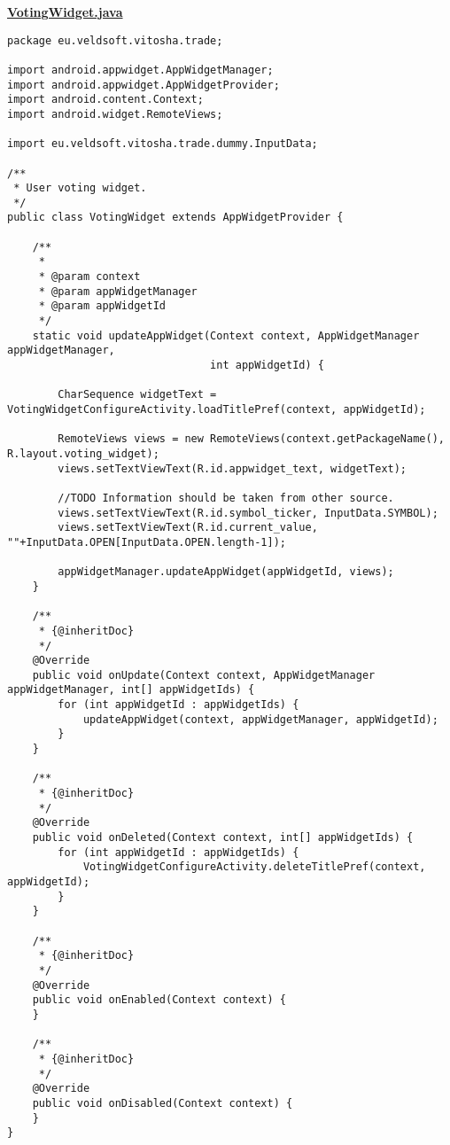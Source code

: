 \textbf{\underline{VotingWidget.java}}
\begin{verbatim}
package eu.veldsoft.vitosha.trade;

import android.appwidget.AppWidgetManager;
import android.appwidget.AppWidgetProvider;
import android.content.Context;
import android.widget.RemoteViews;

import eu.veldsoft.vitosha.trade.dummy.InputData;

/**
 * User voting widget.
 */
public class VotingWidget extends AppWidgetProvider {

    /**
     *
     * @param context
     * @param appWidgetManager
     * @param appWidgetId
     */
    static void updateAppWidget(Context context, AppWidgetManager appWidgetManager,
                                int appWidgetId) {

        CharSequence widgetText = VotingWidgetConfigureActivity.loadTitlePref(context, appWidgetId);

        RemoteViews views = new RemoteViews(context.getPackageName(), R.layout.voting_widget);
        views.setTextViewText(R.id.appwidget_text, widgetText);

        //TODO Information should be taken from other source.
        views.setTextViewText(R.id.symbol_ticker, InputData.SYMBOL);
        views.setTextViewText(R.id.current_value, ""+InputData.OPEN[InputData.OPEN.length-1]);

        appWidgetManager.updateAppWidget(appWidgetId, views);
    }

    /**
     * {@inheritDoc}
     */
    @Override
    public void onUpdate(Context context, AppWidgetManager appWidgetManager, int[] appWidgetIds) {
        for (int appWidgetId : appWidgetIds) {
            updateAppWidget(context, appWidgetManager, appWidgetId);
        }
    }

    /**
     * {@inheritDoc}
     */
    @Override
    public void onDeleted(Context context, int[] appWidgetIds) {
        for (int appWidgetId : appWidgetIds) {
            VotingWidgetConfigureActivity.deleteTitlePref(context, appWidgetId);
        }
    }

    /**
     * {@inheritDoc}
     */
    @Override
    public void onEnabled(Context context) {
    }

    /**
     * {@inheritDoc}
     */
    @Override
    public void onDisabled(Context context) {
    }
}
\end{verbatim}

